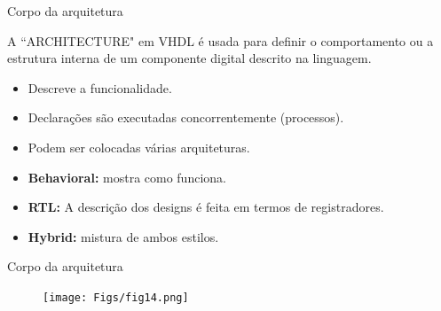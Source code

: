 \documentclass[aspectratio=169]{beamer}
\begin{document}
\begin{frame}{Corpo da arquitetura}
	\justifying
	
	
	\begin{block}{}
	\justifying
	A ``ARCHITECTURE" em VHDL é usada para definir o comportamento ou a estrutura interna de um componente digital descrito na linguagem. 
	
	\begin{itemize}
	\item Descreve a funcionalidade.
	\item Declarações são executadas concorrentemente (processos).
	\item Podem ser colocadas várias arquiteturas.
	\item \textbf{Behavioral:} mostra como funciona.
	\item \textbf{RTL:} A descrição dos designs é feita em termos de registradores.
	\item \textbf{Hybrid:} mistura de ambos estilos.
	\end{itemize}	
	
	\end{block}	
	
\end{frame}


\begin{frame}{Corpo da arquitetura}
	\justifying
	
	\begin{figure}[h]
		\centering
		\texttt{[image: Figs/fig14.png]}
	\end{figure}

\end{frame}

\end{document}
